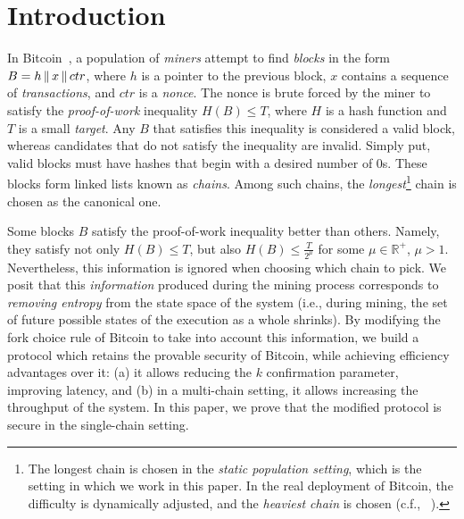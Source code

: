 \section{Introduction}

In Bitcoin~\cite{bitcoin}, a population of \emph{miners}
attempt to find \emph{blocks} in the form $B = h \,\|\, x \,\|\, ctr$,
where $h$ is a pointer to the previous block, $x$ contains a sequence of
\emph{transactions}, and $ctr$ is a \emph{nonce}. The nonce is brute forced
by the miner to satisfy the \emph{proof-of-work} inequality $H(B) \leq T$, where
$H$ is a hash function and $T$ is a small \emph{target}. Any $B$ that satisfies this
inequality is considered a valid block, whereas candidates that do not satisfy
the inequality are invalid. Simply put, valid blocks must have
hashes that begin with a desired number of $0$s.
These blocks form linked lists known as \emph{chains}.
Among such chains, the \emph{longest}\footnote{The
longest chain is chosen in the \emph{static population setting}, which is the
setting in which we work in this paper. In the real deployment of Bitcoin, the
difficulty is dynamically adjusted, and the \emph{heaviest chain} is chosen (c.f.,
~\cite{varbackbone}).} chain is chosen as the canonical one.

Some blocks $B$ satisfy the proof-of-work inequality better than others.
Namely, they satisfy not only $H(B) \leq T$, but also $H(B) \leq \frac{T}{2^\mu}$
for some $\mu \in \mathbb{R}^+$, $\mu > 1$. Nevertheless, this information is ignored when choosing
which chain to pick. We posit that this \emph{information}
produced during the mining process corresponds to \emph{removing entropy} from the
state space of the system (i.e., during mining, the set of future possible states
of the execution as a whole shrinks).
By modifying the fork choice rule of Bitcoin to take into account this information,
we build a protocol which retains the provable security of Bitcoin, while achieving
efficiency advantages over it: (a) it allows reducing the $k$ confirmation parameter,
improving latency, and (b) in a multi-chain setting, it allows increasing the throughput
of the system. In this paper, we prove that the modified protocol is secure in the
single-chain setting.

